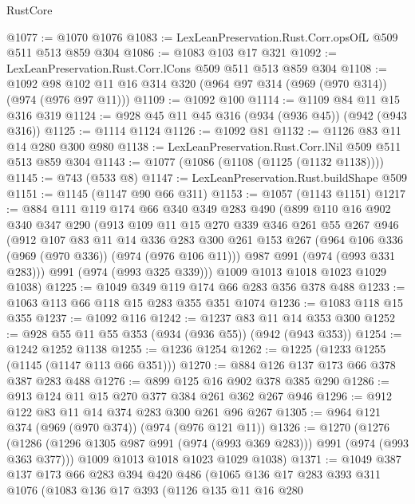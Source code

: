 \begin{lexlean}{RustCore}
\begin{coremodule}
@1077 := @1070 @1076
@1083 := LexLeanPreservation.Rust.Corr.opsOfL @509 @511 @513 @859 @304
@1086 := @1083 @103 @17 @321
@1092 := LexLeanPreservation.Rust.Corr.lCons @509 @511 @513 @859 @304
@1108 := @1092 @98 @102 @11 @16 @314 @320 (@964 @97 @314 (@969 (@970 @314)) (@974 (@976 @97 @11)))
@1109 := @1092 @100
@1114 := @1109 @84 @11 @15 @316 @319
@1124 := @928 @45 @11 @45 @316 (@934 (@936 @45)) (@942 (@943 @316))
@1125 := @1114 @1124
@1126 := @1092 @81
@1132 := @1126 @83 @11 @14 @280 @300 @980
@1138 := LexLeanPreservation.Rust.Corr.lNil @509 @511 @513 @859 @304
@1143 := @1077 (@1086 (@1108 (@1125 (@1132 @1138))))
@1145 := @743 (@533 @8)
@1147 := LexLeanPreservation.Rust.buildShape @509
@1151 := @1145 (@1147 @90 @66 @311)
@1153 := @1057 (@1143 @1151)
@1217 := @884
    @111
    @119
    @174
    @66
    @340
    @349
    @283
    @490
    (@899
      @110
      @16
      @902
      @340
      @347
      @290
      (@913
        @109
        @11
        @15
        @270
        @339
        @346
        @261
        @55
        @267
        @946
        (@912
          @107
          @83
          @11
          @14
          @336
          @283
          @300
          @261
          @153
          @267
          (@964 @106 @336 (@969 (@970 @336)) (@974 (@976 @106 @11)))
          @987
          @991
          (@974 (@993 @331 @283)))
        @991
        (@974 (@993 @325 @339)))
      @1009
      @1013
      @1018
      @1023
      @1029
      @1038)
@1225 := @1049 @349 @119 @174 @66 @283 @356 @378 @488
@1233 := @1063 @113 @66 @118 @15 @283 @355 @351 @1074
@1236 := @1083 @118 @15 @355
@1237 := @1092 @116
@1242 := @1237 @83 @11 @14 @353 @300
@1252 := @928 @55 @11 @55 @353 (@934 (@936 @55)) (@942 (@943 @353))
@1254 := @1242 @1252 @1138
@1255 := @1236 @1254
@1262 := @1225 (@1233 @1255 (@1145 (@1147 @113 @66 @351)))
@1270 := @884 @126 @137 @173 @66 @378 @387 @283 @488
@1276 := @899 @125 @16 @902 @378 @385 @290
@1286 := @913 @124 @11 @15 @270 @377 @384 @261 @362 @267 @946
@1296 := @912 @122 @83 @11 @14 @374 @283 @300 @261 @96 @267
@1305 := @964 @121 @374 (@969 (@970 @374)) (@974 (@976 @121 @11))
@1326 := @1270
    (@1276
      (@1286 (@1296 @1305 @987 @991 (@974 (@993 @369 @283))) @991 (@974 (@993 @363 @377)))
      @1009
      @1013
      @1018
      @1023
      @1029
      @1038)
@1371 := @1049
    @387
    @137
    @173
    @66
    @283
    @394
    @420
    @486
    (@1065
      @136
      @17
      @283
      @393
      @311
      @1076
      (@1083
        @136
        @17
        @393
        (@1126
          @135
          @11
          @16
          @280

\end{coremodule}
\end{lexlean}
